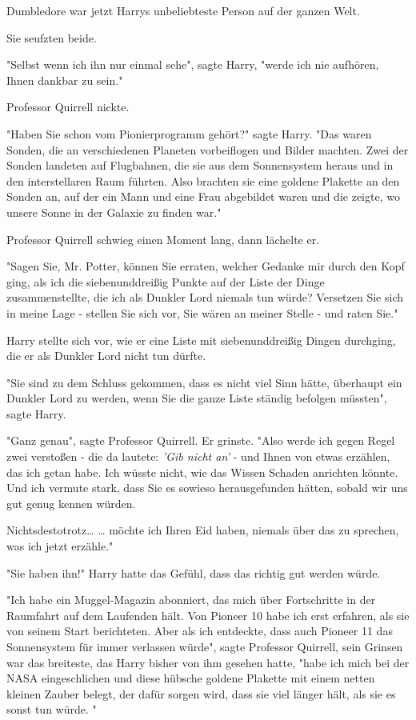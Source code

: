 {Dumbledore war jetzt Harrys unbeliebteste Person auf der ganzen Welt.

Sie seufzten beide.

"Selbst wenn ich ihn nur einmal sehe", sagte Harry, "werde ich nie aufhören, Ihnen dankbar zu sein."

Professor Quirrell nickte.

"Haben Sie schon vom Pionierprogramm gehört?" sagte Harry. "Das waren Sonden, die an verschiedenen Planeten vorbeiflogen und Bilder machten. Zwei der Sonden landeten auf Flugbahnen, die sie aus dem Sonnensystem heraus und in den interstellaren Raum führten. Also brachten sie eine goldene Plakette an den Sonden an, auf der ein Mann und eine Frau abgebildet waren und die zeigte, wo unsere Sonne in der Galaxie zu finden war."

Professor Quirrell schwieg einen Moment lang, dann lächelte er.

"Sagen Sie, Mr. Potter, können Sie erraten, welcher Gedanke mir durch den Kopf ging, als ich die siebenunddreißig Punkte auf der Liste der Dinge zusammenstellte, die ich als Dunkler Lord niemals tun würde? Versetzen Sie sich in meine Lage - stellen Sie sich vor, Sie wären an meiner Stelle - und raten Sie."

Harry stellte sich vor, wie er eine Liste mit siebenunddreißig Dingen durchging, die er als Dunkler Lord nicht tun dürfte.

"Sie sind zu dem Schluss gekommen, dass es nicht viel Sinn hätte, überhaupt ein Dunkler Lord zu werden, wenn Sie die ganze Liste ständig befolgen müssten", sagte Harry.

"Ganz genau", sagte Professor Quirrell. Er grinste. "Also werde ich gegen Regel zwei verstoßen - die da lautete: \emph{'Gib nicht an'} - und Ihnen von etwas erzählen, das ich getan habe. Ich wüsste nicht, wie das Wissen Schaden anrichten könnte. Und ich vermute stark, dass Sie es sowieso herausgefunden hätten, sobald wir uns gut genug kennen würden.

Nichtsdestotrotz… … möchte ich Ihren Eid haben, niemals über das zu sprechen, was ich jetzt erzähle."

"Sie haben ihn!" Harry hatte das Gefühl, dass das richtig gut werden würde.

"Ich habe ein Muggel-Magazin abonniert, das mich über Fortschritte in der Raumfahrt auf dem Laufenden hält. Von Pioneer 10 habe ich erst erfahren, als sie von seinem Start berichteten. Aber als ich entdeckte, dass auch Pioneer 11 das Sonnensystem für immer verlassen würde", sagte Professor Quirrell, sein Grinsen war das breiteste, das Harry bisher von ihm gesehen hatte, "habe ich mich bei der NASA eingeschlichen und diese hübsche goldene Plakette mit einem netten kleinen Zauber belegt, der dafür sorgen wird, dass sie viel länger hält, als sie es sonst tun würde. "

}
